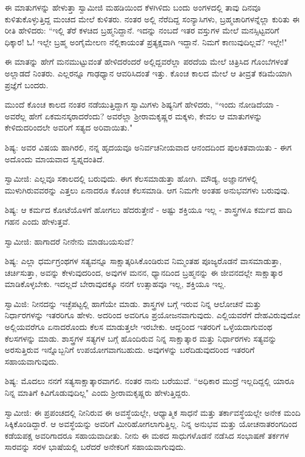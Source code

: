 ಈ ಮಾತುಗಳನ್ನು ಹೇಳುತ್ತಾ ಸ್ವಾಮೀಜಿ ಮಹಡಿಯಿಂದ ಕೆಳಗಿಳಿದು ಬಂದು ಅಂಗಳದಲ್ಲಿ ತಾವು ದಿನವೂ ಕುಳಿತುಕೊಳ್ಳುತ್ತಿದ್ದ ಮಂಚದ ಮೇಲೆ ಕುಳಿತರು. ನಂತರ ಅಲ್ಲಿ ನೆರೆದಿದ್ದ ಸಂನ್ಯಾಸಿಗಳು, ಬ್ರಹ್ಮಚಾರಿಗಳನ್ನೆಲ್ಲಾ ಕುರಿತು ಈ ರೀತಿ ಹೇಳಿದರು: “ಇಲ್ಲಿ ತೆರೆ ಕಳಚಿದ ಬ್ರಹ್ಮನಿದ್ದಾನೆ. ಇದನ್ನು ನಂಬದೆ ಇತರ ವಸ್ತುಗಳ ಮೇಲೆ ಮನಸ್ಸಿಟ್ಟವರಿಗೆ ಧಿಕ್ಕಾರ! ಓ! ಇಲ್ಲೇ ಬ್ರಹ್ಮ ಅಂಗೈಮೇಲಣ ನೆಲ್ಲಿಕಾಯಂತೆ ಪ್ರತ್ಯಕ್ಷವಾಗಿ ಇದ್ದಾನೆ. ನಿಮಗೆ ಕಾಣುವುದಿಲ್ಲವೆ? ಇಲ್ಲೇ!"

ಈ ಮಾತನ್ನು ಹೇಗೆ ಮನಮುಟ್ಟುವಂತೆ ಹೇಳಿದರೆಂದರೆ ಅಲ್ಲಿದ್ದವರೆಲ್ಲಾ ಪರದೆಯ ಮೇಲೆ ಚಿತ್ರಿಸಿದ ಗೊಂಬೆಗಳಂತೆ ಅಲ್ಲಾಡದೆ ನಿಂತರು. ಎಲ್ಲರನ್ನೂ ಗಾಢಧ್ಯಾನ ಆವರಿಸಿದಂತೆ ಇತ್ತು. ಕೊಂಚ ಕಾಲದ ಮೇಲೆ ಆ ತೀವ್ರತೆ ಕಡಿಮೆಯಾಗಿ ಪ್ರಜ್ಞೆಗೆ ಬಂದರು.

ಮುಂದೆ ಕೊಂಚ ಕಾಲದ ನಂತರ ನಡೆಯುತ್ತಿದ್ದಾಗ ಸ್ವಾಮಿಗಳು ಶಿಷ್ಯನಿಗೆ ಹೇಳಿದರು, “ಇಂದು ನೋಡಿದೆಯಾ - ಅವರೆಲ್ಲ ಹೇಗೆ ಏಕಮನಸ್ಕರಾದರೆಂದು? ಅವರೆಲ್ಲಾ ಶ‍್ರೀರಾಮಕೃಷ್ಣರ ಮಕ್ಕಳು, ಕೇವಲ ಆ ಮಾತುಗಳನ್ನು ಕೇಳಿದುದರಿಂದಲೇ ಅವರಿಗೆ ಸತ್ಯದ ಅರಿವಾಯಿತು."

ಶಿಷ್ಯ: ಅವರ ವಿಷಯ ಹಾಗಿರಲಿ, ನನ್ನ ಹೃದಯವೂ ಅನಿರ್ವಚನೀಯವಾದ ಆನಂದದಿಂದ ಪುಲಕಿತವಾಯಿತು - ಈಗ ಅದೊಂದು ಮಾಯವಾದ ಸ್ವಪ್ನದಂತಿದೆ.

ಸ್ವಾಮೀಜಿ: ಎಲ್ಲವೂ ಸಕಾಲದಲ್ಲಿ ಬರುವುದು. ಈಗ ಕೆಲಸಮಾಡುತ್ತಾ ಹೋಗಿ. ಮೌಡ್ಯ, ಅಜ್ಞಾನಗಳಲ್ಲಿ ಮುಳುಗಿರುವವರನ್ನು ಎತ್ತಲು ಏನಾದರೂ ಕೊಂಚ ಕೆಲಸಮಾಡಿ. ಆಗ ನಿಮಗೇ ಅಂತಹ ಅನುಭವಗಳು ಬರುವುವು.

ಶಿಷ್ಯ: ಆ ಕರ್ಮದ ಕೋಟೆಯೊಳಗೆ ಹೋಗಲು ಹೆದರುತ್ತೇನೆ - ಅಷ್ಟು ಶಕ್ತಿಯೂ ಇಲ್ಲ - ಶಾಸ್ತ್ರಗಳೂ ಕರ್ಮದ ಹಾದಿ ಗಹನ ಎಂದು ಹೇಳುತ್ತವೆ.

ಸ್ವಾಮೀಜಿ: ಹಾಗಾದರೆ ನೀನೇನು ಮಾಡಬಯಸುವೆ?

ಶಿಷ್ಯ: ಎಲ್ಲಾ ಧರ್ಮಗ್ರಂಥಗಳ ಸತ್ಯವನ್ನೂ ಸಾಕ್ಷಾತ್ಕರಿಸಿಕೊಂಡಿರುವ ನಿಮ್ಮಂತಹ ಪೂಜ್ಯರೊಡನೆ ವಾಸಮಾಡುತ್ತಾ, ಚರ್ಚಿಸುತ್ತಾ, ಅವನ್ನು ಕೇಳುವುದರಿಂದ, ಅವುಗಳ ಮನನ, ಧ್ಯಾನದಿಂದ ಬ್ರಹ್ಮನನ್ನು ಈ ಜೀವನದಲ್ಲೇ ಸಾಕ್ಷಾತ್ಕಾರ ಮಾಡಿಕೊಳ್ಳಬೇಕು. ಇದಲ್ಲದೆ ಬೇರಾವುದಕ್ಕೂ ನನಗೆ ಉತ್ಸಾಹವೂ ಇಲ್ಲ, ಶಕ್ತಿಯೂ ಇಲ್ಲ.

ಸ್ವಾಮಿಜಿ: ನೀನದನ್ನು ಇಚ್ಛೆಪಟ್ಟಲ್ಲಿ ಹಾಗೆಯೇ ಮಾಡು. ಶಾಸ್ತ್ರಗಳ ಬಗ್ಗೆ ಇರುವ ನಿನ್ನ ಆಲೋಚನೆ ಮತ್ತು ನಿರ್ಧಾರಗಳನ್ನು ಇತರರಿಗೂ ಹೇಳು. ಅದರಿಂದ ಅವರಿಗೂ ಪ್ರಯೋಜನವಾಗುವುದು. ಎಲ್ಲಿಯವರೆಗೆ ದೇಹವಿರುವುದೋ ಅಲ್ಲಿಯವರೆಗೂ ಏನಾದರೊಂದು ಕೆಲಸ ಮಾಡುತ್ತಲೇ ಇರಬೇಕು. ಆದ್ದರಿಂದ ಇತರರಿಗೆ ಒಳ್ಳೆಯದಾಗುವಂಥ ಕೆಲಸಗಳನ್ನು ಮಾಡು. ಶಾಸ್ತ್ರಗಳ ಸತ್ಯಗಳ ಬಗ್ಗೆ ಹೊಂದಿರುವ ನಿನ್ನ ಸಾಕ್ಷಾತ್ಕಾರ ಮತ್ತು ನಿರ್ಧಾರಗಳು ಸತ್ಯವನ್ನು ಅರಸುತ್ತಿರುವ ಇನ್ನೊಬ್ಬನಿಗೆ ಉಪಯೋಗವಾಗಬಹುದು. ಅವುಗಳನ್ನು ಬರೆದಿಡುವುದರಿಂದ ಇತರರಿಗೆ ಸಹಾಯವಾಗುವುದು.

ಶಿಷ್ಯ: ಮೊದಲು ನನಗೆ ಸತ್ಯಸಾಕ್ಷಾತ್ಕಾರವಾಗಲಿ. ನಂತರ ನಾನು ಬರೆಯುವೆ. “ಅಧಿಕಾರ ಮುದ್ರೆ ಇಲ್ಲದಿದ್ದಲ್ಲಿ ಯಾರೂ ನಿನ್ನ ಮಾತಿಗೆ ಕಿವಿಗೊಡುವುದಿಲ್ಲ" ಎಂದು ಶ‍್ರೀರಾಮಕೃಷ್ಣರು ಹೇಳುತ್ತಿದ್ದರು.

ಸ್ವಾಮೀಜಿ: ಈ ಪ್ರಪಂಚದಲ್ಲಿ ನೀನಿರುವ ಈ ಅವಸ್ಥೆಯಲ್ಲೇ, ಆಧ್ಯಾತ್ಮಿಕ ಸಾಧನೆ ಮತ್ತು ತರ್ಕಾವಸ್ಥೆಯಲ್ಲೇ ಅನೇಕ ಮಂದಿ ಸಿಕ್ಕಿಕೊಂಡಿದ್ದಾರೆ. ಆ ಅವಸ್ಥೆಯನ್ನು ಅವರಿಗೆ ಮೀರಿಹೋಗಲಾಗುತ್ತಿಲ್ಲ. ನಿನ್ನ ಅನುಭವ ಮತ್ತು ಯೋಚನಾತರಂಗದಿಂದ ಕಡೆಯಪಕ್ಷ ಅವರಿಗಾದರೂ ಸಹಾಯವಾದೀತು. ನೀನು ಈ ಮಠದ ಸಾಧುಗಳೊಡನೆ ನಡೆಸಿದ ಸಂಭಾಷಣೆ ತರ್ಕಗಳ ಸಾರವನ್ನು ಸರಳ ಭಾಷೆಯಲ್ಲಿ ಬರೆದರೆ ಅನೇಕರಿಗೆ ಸಹಾಯವಾಗುವುದು.

